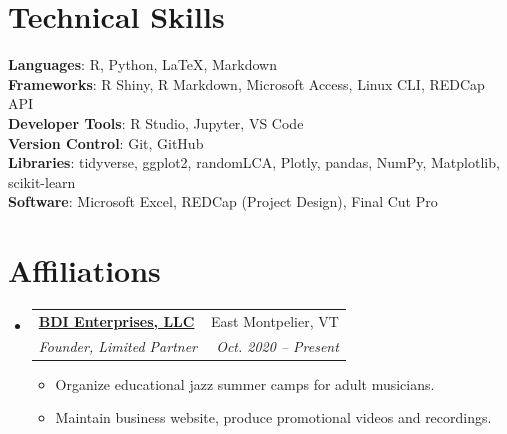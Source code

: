 \documentclass[letterpaper,11pt]{article}
\makeatletter
\newcommand{\resumeItem}[1]{
  \item\small{
    {#1 \vspace{-2pt}}
  }
}
\newcommand{\resumeSubheading}[4]{
  \vspace{-2pt}\item
    \begin{tabular*}{0.97\textwidth}[t]{l@{\extracolsep{\fill}}r}
      \textbf{#1} & #2 \\
      \textit{\small#3} & \textit{\small #4} \\
    \end{tabular*}\vspace{-7pt}
}
\newcommand{\resumeSubHeadingListStart}{\begin{itemize}[leftmargin=0.15in, label={}]}
\newcommand{\resumeSubHeadingListEnd}{\end{itemize}}
\newcommand{\resumeItemListStart}{\begin{itemize}}
\newcommand{\resumeItemListEnd}{\end{itemize}\vspace{-5pt}}
\makeatother
\begin{document}
\section{Technical Skills}
\begin{itemize}[leftmargin=0.15in, label={}]
	\small{\item{
			\textbf{Languages}{: R, Python, \LaTeX, Markdown} \\
			\textbf{Frameworks}{: R Shiny, R Markdown, Microsoft Access, Linux CLI, REDCap API} \\
			\textbf{Developer Tools}{: R Studio, Jupyter, VS Code} \\
			\textbf{Version Control}{: Git, GitHub} \\
			\textbf{Libraries}{: tidyverse, ggplot2, randomLCA, Plotly, pandas, NumPy, Matplotlib, scikit-learn} \\
			\textbf{Software}{: Microsoft Excel, REDCap (Project Design), Final Cut Pro}
	}}
\end{itemize}

\section{Affiliations}
	\resumeSubHeadingListStart
		\resumeSubheading{\href{https://www.jazzinthemountains.com/}{BDI Enterprises, LLC}
		}
		{East Montpelier, VT}
		{Founder, Limited Partner}{Oct. 2020 -- Present}
		\resumeItemListStart
		    \resumeItem{Organize educational jazz summer camps for adult musicians.}
		    \resumeItem{Maintain business website, produce promotional videos and recordings.}
		\resumeItemListEnd
	\resumeSubHeadingListEnd
	

%
\end{document}
